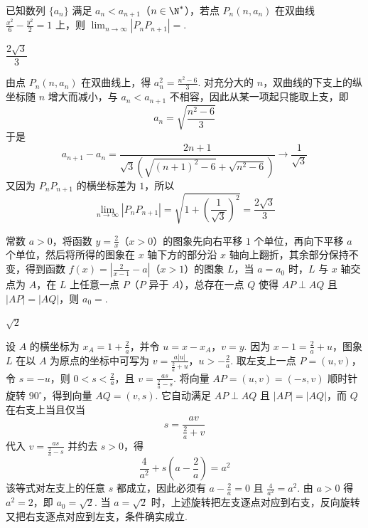 \begin{problem}
已知数列 \(\{a_n\}\) 满足 \(a_n<a_{n+1}\)（\(n\in\N^*\)），若点 \(P_n(n,a_n)\) 在双曲线 \(\frac{x^2}{6}-\frac{y^2}{2}=1\) 上，则 \(\displaystyle\lim_{n\to\infty}|P_nP_{n+1}|=\)\fillinblank{}.
\end{problem}

\begin{answer}
\(\dfrac{2\sqrt{3}}{3}\)
\end{answer}

\begin{solution}
由点 \(P_n(n,a_n)\) 在双曲线上，得 \(a_n^2=\frac{n^2-6}{3}\). 对充分大的 \(n\)，双曲线的下支上的纵坐标随 \(n\) 增大而减小，与 \(a_n<a_{n+1}\) 不相容，因此从某一项起只能取上支，即
\[
a_n=\sqrt{\frac{n^2-6}{3}}
\]
于是
\[
a_{n+1}-a_n=\frac{2n+1}{\sqrt3\left(\sqrt{(n+1)^2-6}+\sqrt{n^2-6}\right)}\longrightarrow\frac1{\sqrt3}
\]
又因为 \(P_nP_{n+1}\) 的横坐标差为 \(1\)，所以
\[
\lim_{n\to\infty}|P_nP_{n+1}|=\sqrt{1+\left(\frac1{\sqrt3}\right)^2}=\frac{2\sqrt3}{3}
\]
\end{solution}

\begin{problem}
常数 \(a>0\)，将函数 \(y=\frac2x\)（\(x>0\)）的图象先向右平移 \(1\) 个单位，再向下平移 \(a\) 个单位，然后将所得的图象在 \(x\) 轴下方的部分沿 \(x\) 轴向上翻折，其余部分保持不变，得到函数 \(f(x)=\left|\frac2{x-1}-a\right|\)（\(x>1\)）的图象 \(L\)，当 \(a=a_0\) 时，\(L\) 与 \(x\) 轴交点为 \(A\)，在 \(L\) 上任意一点 \(P\)（\(P\) 异于 \(A\)），总存在一点 \(Q\) 使得 \(AP\perp AQ\) 且 \(|AP|=|AQ|\)，则 \(a_0=\)\fillinblank{}.
\end{problem}

\begin{answer}
\(\sqrt{2}\)
\end{answer}

\begin{solution}
设 \(A\) 的横坐标为 \(x_A=1+\frac2a\)，并令 \(u=x-x_A\)，\(v=y\). 因为 \(x-1=\frac2a+u\)，图象 \(L\) 在以 \(A\) 为原点的坐标中可写为
\(v=\frac{a|u|}{\frac2a+u}\)，\(u>-\frac2a\).
取左支上一点 \(P=(u,v)\)，令 \(s=-u\)，则 \(0<s<\frac2a\)，且 \(v=\frac{as}{\frac{2}{a}-s}\). 将向量 \(AP=(u,v)=(-s,v)\) 顺时针旋转 \(90^\circ\)，得到向量 \(AQ=(v,s)\). 它自动满足 \(AP\perp AQ\) 且 \(|AP|=|AQ|\)，而 \(Q\) 在右支上当且仅当
\[
s=\frac{av}{\frac{2}{a}+v}
\]
代入 \(v=\frac{as}{\frac{2}{a}-s}\) 并约去 \(s>0\)，得
\[
\frac4{a^2}+s\left(a-\frac2a\right)=a^2
\]
该等式对左支上的任意 \(s\) 都成立，因此必须有 \(a-\frac2a=0\) 且 \(\frac4{a^2}=a^2\). 由 \(a>0\) 得 \(a^2=2\)，即 \(a_0=\sqrt2\). 当 \(a=\sqrt2\) 时，上述旋转把左支逐点对应到右支，反向旋转又把右支逐点对应到左支，条件确实成立.
\end{solution}


